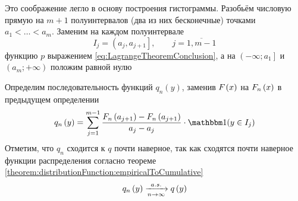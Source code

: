 Это соображение легло в основу построения гистограммы.
Разобьём числовую прямую на $m+1$ полуинтервалов (два из них бесконечные)
точками $a_1 < \dots < a_m$.
Заменим на каждом полуинтервале
\begin{equation*}
  I_j = \left( a_j, a_{j+1} \right],\qquad j=\overline{1,m-1} 
\end{equation*}
функцию $p$ выражением \ref{eq:LagrangeTheoremConclusion},
а на $\left( -\infty; a_1 \right]$ и $\left( a_m; +\infty \right)$ положим
равной нулю
\begin{comment}
Возьмём $m$ полуинтервалов на числовой прямой
$I_j= \left(a_{j-1},a_j\right], i= \overline{1,m}$
таких, каждое значение выборки попадает в свой интервал.
Для этого определим пару свойств точек, ограничивающих эти интервалы:
\begin{enumerate}
  \item Каждая следующая точка строго правее (больше) предыдущей
    (так как зачем нам одинаковые точки?)
    $$a_0<a_1<\dots<a_m$$
  \item Каждое значение выборки должно попадать ровно в один полуинтервал.
    Очевидно, что данные полуинтервалы $I_j$ не пересекаются между собой.
    Значит, осталось потребовать, чтобы
    крайнее левое значение было меньше минимального значения из выборки,
    а крайнее правое --- не меньше максимального
    $$a_0<min\left(X\right)\le max\left(X\right)\le a_m$$
\end{enumerate}

Введём функцию $q\left(y\right)$
$$q\left(y\right)
= \sum_{j=1}^m \frac{\cdf{a_j}-\cdf{a_{j-1}}}{a_j-a_{j-1}}
  \cdot \indicator{y\in I_j}$$
\end{comment}
Определим последовательность функций $q_n\left(y\right)$,
заменив $F_{}\left(x\right)$ на $F_n\left(x\right)$ в предыдущем определении
\begin{equation}\label{eq:histogram_start}
  q_n\left(y\right)
  = \sum_{j=1}^{m-1} \frac{\cdfn{a_{j+1}}-\cdfn{a_{j+1}}}{a_j-a_j}
    \cdot \indicator{y\in I_j}
\end{equation}
Отметим, что $q_n$ сходится к $q$ почти наверное, так как сходятся почти
наверное функции распределения согласно теореме
\ref{theorem:distributionFunction:empiricalToCumulative}
$$q_n\left(y\right)\xrightarrow[n\to\infty]{a.s.} q\left(y\right)$$
\begin{comment}
Функция $q$ в свою очередь сходится к $p$, так как приблизительно равна
производной, а при бесконечно большом количестве интервалов их длины
становятся бесконечно малыми
\end{comment}
